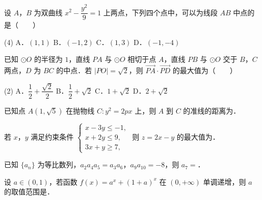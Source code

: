 \begin{question}
设 $A\text{，}B$ 为双曲线 $x^2-\dfrac{y^2}{9}=1$ 上两点，下列四个点中，可以为线段 $AB$ 中点的是\mbox{（　　）}

\begin{gkopts}(4)
\task A．$(1,1)$
\task B．$(-1,2)$
\task C．$(1,3)$
\task D．$(-1,-4)$
\end{gkopts}

\end{question}
\begin{question}
已知 $\odot O$ 的半径为 $1$，直线 $PA$ 与 $\odot O$ 相切于点 $A$，直线 $PB$ 与 $\odot O$ 交于 $B\text{，}C$ 两点，$D$ 为 $BC$ 的中点．若 $|PO|=\sqrt2$，则 $\overrightarrow{PA}\cdot\overrightarrow{PD}$ 的最大值为\mbox{（　　）}

\begin{gkopts}(2)
\task A．$\dfrac12+\dfrac{\sqrt2}{2}$
\task B．$\dfrac12+\sqrt2$
\task C．$1+\sqrt2$
\task D．$2+\sqrt2$
\end{gkopts}

\par\medskip

\end{question}

\begin{question}
已知点 $A(1,\sqrt5)$ 在抛物线 $C:y^2=2px$ 上，则 $A$ 到 $C$ 的准线的距离为\gkblank{}．

\end{question}
\begin{question}
若 $x\text{，}y$ 满足约束条件 $\begin{cases}x-3y\leqslant-1,\\x+2y\leqslant9,\\3x+y\geqslant7,\end{cases}$ 则 $z=2x-y$ 的最大值为\gkblank{}．

\end{question}
\begin{question}
已知 $\{a_n\}$ 为等比数列，$a_2a_4a_5=a_3a_6$，$a_9a_{10}=-8$，则 $a_7=$\gkblank{}．

\end{question}
\begin{question}
设 $a\in(0,1)$，若函数 $f(x)=a^x+(1+a)^x$ 在 $(0,+\infty)$ 单调递增，则 $a$ 的取值范围是\gkblank{}．

\par\medskip

\end{question}


